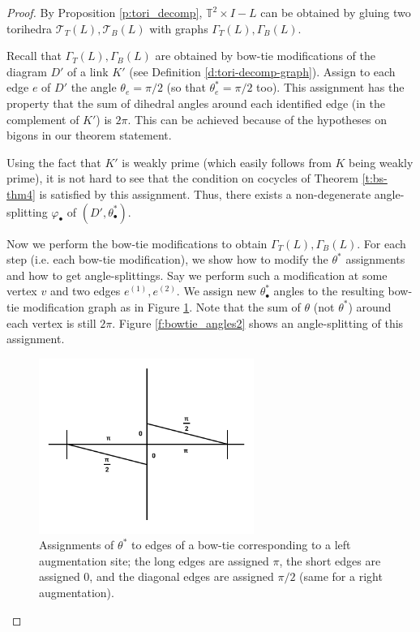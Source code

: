 \documentclass[11pt]{amsart}
\newcommand{\thmref}[1]{Theorem \ref{#1}}
\newcommand{\prpref}[1]{Proposition \ref{#1}}
\newcommand{\defref}[1]{Definition \ref{#1}}
\newcommand{\figref}[1]{Figure \ref{#1}}
\newcommand{\torus}{{\mathbb{T}^2}}
\newcommand{\sT}{{\mathcal{T}}}
\newcommand{\vphi}{\varphi}
\newcommand{\toruscomp}[1]{{\torus \times I - #1}}
\theoremstyle{plain}
\theoremstyle{definition}
\begin{document}
\begin{proof}
By \prpref{p:tori_decomp}, $\toruscomp{L}$ can be
obtained by gluing two torihedra $\sT_T(L),\sT_B(L)$
with graphs $\Gamma_T(L),\Gamma_B(L)$.


Recall that $\Gamma_T(L),\Gamma_B(L)$ are
obtained by bow-tie modifications of the diagram $D'$
of a link $K'$
(see \defref{d:tori-decomp-graph}).
Assign to each edge $e$ of $D'$ the angle $\theta_e = \pi/2$
(so that $\theta_e^* = \pi/2$ too).
This assignment has the property that
the sum of dihedral angles around each identified edge
(in the complement of $K'$) is $2\pi$.
This can be achieved because of the hypotheses on bigons
in our theorem statement.


Using the fact that $K'$ is weakly prime
(which easily follows from $K$ being weakly prime),
it is not hard to see that the condition on cocycles
of \thmref{t:bs-thm4} is satisfied by this assignment.
Thus, there exists a non-degenerate angle-splitting
$\vphi_\bullet$ of $(D',\theta_\bullet^*)$.


Now we perform the bow-tie modifications to obtain
$\Gamma_T(L),\Gamma_B(L)$.
For each step (i.e. each bow-tie modification),
we show how to modify the $\theta^*$ assignments
and how to get angle-splittings.
Say we perform such a modification
at some vertex $v$ and two edges $e^{(1)},e^{(2)}$.
We assign new $\theta_\bullet^*$ angles to
the resulting bow-tie modification graph
as in \figref{f:bowtie_angles}.
Note that the sum of $\theta$ (not $\theta^*$)
around each vertex is still $2\pi$.
\figref{f:bowtie_angles2} shows an angle-splitting
of this assignment.


\begin{figure}
\includegraphics[width=7cm]{more_pictures/horizontal_bowtie.png}
\caption{Assignments of $\theta^*$ to edges of a bow-tie
	corresponding to a left augmentation site;
	the long edges are assigned $\pi$,
	the short edges are assigned 0,
	and the diagonal edges are assigned $\pi/2$
	(same for a right augmentation).
	}
\label{f:bowtie_angles}
\end{figure}


\end{proof}
\end{document}
